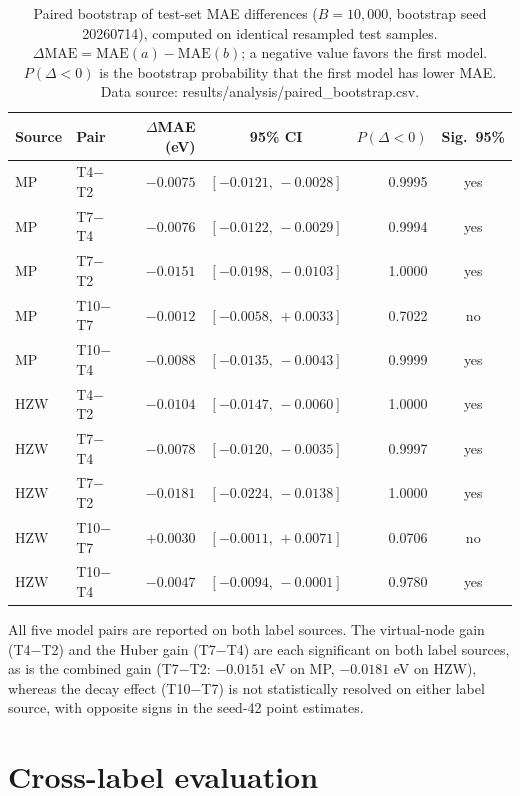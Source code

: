 \documentclass[a4paper,10pt]{article}
\begin{document}
\begin{table}[htbp]
\centering
\caption{Paired bootstrap of test-set MAE differences (\(B=10{,}000\), bootstrap seed 20260714), computed on identical resampled test samples. \(\Delta\mathrm{MAE}=\mathrm{MAE}(a)-\mathrm{MAE}(b)\); a negative value favors the first model. \(P(\Delta<0)\) is the bootstrap probability that the first model has lower MAE. Data source: \textnormal{results/analysis/paired\_bootstrap.csv}.}
\label{tab:paired-bootstrap}
\small
\begin{tabular}{l l r c r c}
\toprule
Source & Pair & \(\Delta\)MAE (eV) & 95\% CI & \(P(\Delta<0)\) & Sig.\ 95\% \\
\midrule
MP  & T4\(-\)T2  & \(-0.0075\) & \([-0.0121,\,-0.0028]\) & 0.9995 & yes \\
MP  & T7\(-\)T4  & \(-0.0076\) & \([-0.0122,\,-0.0029]\) & 0.9994 & yes \\
MP  & T7\(-\)T2  & \(-0.0151\) & \([-0.0198,\,-0.0103]\) & 1.0000 & yes \\
MP  & T10\(-\)T7 & \(-0.0012\) & \([-0.0058,\,+0.0033]\) & 0.7022 & no \\
MP  & T10\(-\)T4 & \(-0.0088\) & \([-0.0135,\,-0.0043]\) & 0.9999 & yes \\
\midrule
HZW & T4\(-\)T2  & \(-0.0104\) & \([-0.0147,\,-0.0060]\) & 1.0000 & yes \\
HZW & T7\(-\)T4  & \(-0.0078\) & \([-0.0120,\,-0.0035]\) & 0.9997 & yes \\
HZW & T7\(-\)T2  & \(-0.0181\) & \([-0.0224,\,-0.0138]\) & 1.0000 & yes \\
HZW & T10\(-\)T7 & \(+0.0030\) & \([-0.0011,\,+0.0071]\) & 0.0706 & no \\
HZW & T10\(-\)T4 & \(-0.0047\) & \([-0.0094,\,-0.0001]\) & 0.9780 & yes \\
\bottomrule
\end{tabular}
\end{table}

All five model pairs are reported on both label sources. The virtual-node gain (T4\(-\)T2) and the Huber gain (T7\(-\)T4) are each significant on both label sources, as is the combined gain (T7\(-\)T2: \(-0.0151\) eV on MP, \(-0.0181\) eV on HZW), whereas the decay effect (T10\(-\)T7) is not statistically resolved on either label source, with opposite signs in the seed-42 point estimates.

\section{Cross-label evaluation}
\end{document}
